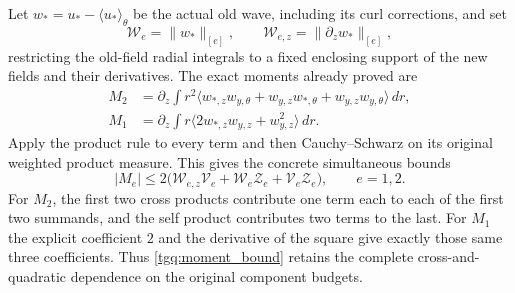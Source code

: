 \documentclass[11pt]{article}
\begin{document}
Let $w_*=u_*-\langle u_*\rangle_\theta$ be the actual old wave,
including its curl corrections, and set
\[
 \mathcal W_e=\|w_*\|_{[e]},\qquad
 \mathcal W_{e,z}=\|\partial_zw_*\|_{[e]},
\]
restricting the old-field radial integrals to a fixed enclosing support
of the new fields and their derivatives. The exact moments already
proved are
\begin{align*}
 M_2&=\partial_z\int r^2
   \langle w_{*,z}w_{y,\theta}+w_{y,z}w_{*,\theta}
                         +w_{y,z}w_{y,\theta}\rangle\,dr,\\
 M_1&=\partial_z\int r
   \langle2w_{*,z}w_{y,z}+w_{y,z}^2\rangle\,dr .
\end{align*}
Apply the product rule to every term and then Cauchy--Schwarz on its
original weighted product measure. This gives the concrete simultaneous
bounds
\begin{equation}
 |M_e|\le
 2\bigl(\mathcal W_{e,z}\mathcal V_e+
         \mathcal W_e\mathcal Z_e+
         \mathcal V_e\mathcal Z_e\bigr),\qquad e=1,2.
 \label{tgq:moment_bound}
\end{equation}
For $M_2$, the first two cross products contribute one term each to
each of the first two summands, and the self product contributes two
terms to the last. For $M_1$ the explicit coefficient $2$ and the
derivative of the square give exactly those same three coefficients.
Thus \eqref{tgq:moment_bound} retains the complete cross-and-quadratic
dependence on the original component budgets.
\end{document}
